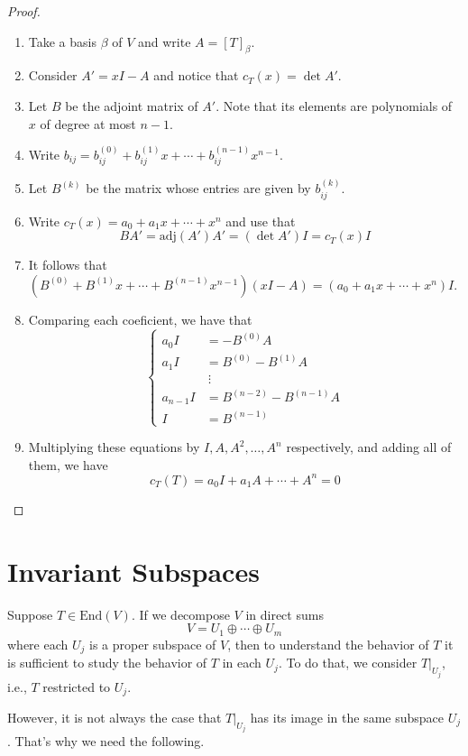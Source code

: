 \begin{proof}
	\begin{enumerate}
		\item Take a basis $\beta$ of $V$ and write $A = [T]_\beta$.
		\item Consider $A' = xI - A$ and notice that $c_T(x) = \det A'$.
		\item Let $B$ be the adjoint matrix of $A'$. Note that its elements are polynomials of $x$ of degree at most $n-1$.
		\item Write $b_{ij} = b_{ij}^{(0)} + b_{ij}^{(1)}x + \cdots + b_{ij}^{(n-1)}x^{n-1}$.
		\item Let $B^{(k)}$ be the matrix whose entries are given by $b_{ij}^{(k)}$.
		\item Write $c_T(x) = a_0 + a_1 x + \cdots + x^n$ and use that \[ B A' = \text{adj}(A') A' = (\det A') I = c_T(x) I \]
		\item It follows that $(B^{(0)} + B^{(1)} x + \cdots + B^{(n-1)} x^{n-1})(xI - A) = (a_0 + a_1 x + \cdots + x^n) I$.
		\item Comparing each coeficient, we have that
		\[
			\begin{cases}
				a_0 I &= -B^{(0)}A \\
				a_1 I &= B^{(0)} - B^{(1)}A \\
				&~\vdots \\
				a_{n-1} I &= B^{(n-2)} - B^{(n-1)}A \\
				I &= B^{(n-1)}
			\end{cases}
		\]
		\item Multiplying these equations by $I, A, A^2, \ldots, A^n$ respectively, and adding all of them, we have \[ c_T(T) = a_0 I + a_1 A + \cdots + A^n = 0 \]
	\end{enumerate}
\end{proof}

\section{Invariant Subspaces}\label{sec:inv_sub}

Suppose $T \in \text{End}(V)$. If we decompose $V$ in direct sums
	\[
		V = U_1 \oplus \cdots \oplus U_m
	\]
where each $U_j$ is a proper subspace of $V$, then to understand the behavior of $T$ it is sufficient to study the behavior of $T$ in each $U_j$. To do that, we consider $T|_{U_j}$, i.e., $T$ restricted to $U_j$.

However, it is not always the case that $T|_{U_j}$ has its image in the same subspace ${U_j}$. That's why we need the following.

